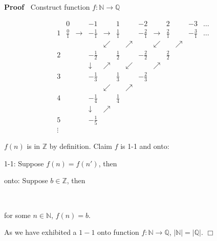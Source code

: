 \documentclass{article}
\newenvironment{proof}{\noindent\textbf{Proof\ }}{\hspace*{\fill}$\Box$\medskip}
\begin{document}
\begin{proof}
  Construct function $f : \mathbb{N} \rightarrow \mathbb{Q}$
  
  
  \[ \begin{array}{lllllllllllll}
       & 0 &  & - 1 &  & 1 &  & - 2 &  & 2 &  & - 3 & \ldots\\
       1 & \frac{0}{1} & \rightarrow & - \frac{1}{1} & \rightarrow &
       \frac{1}{1} &  & - \frac{2}{1} & \rightarrow & \frac{2}{1} &  & -
       \frac{3}{1} & \ldots\\
       &  &  &  & \swarrow &  & \nearrow &  & \swarrow &  & \nearrow &  & \\
       2 &  &  & - \frac{1}{2} &  & \frac{1}{2} &  & - \frac{2}{2} &  &
       \frac{2}{2} &  &  & \\
       &  &  & \downarrow & \nearrow &  & \swarrow &  & \nearrow &  &  &  &
       \\
       3 &  &  & - \frac{1}{3} &  & \frac{1}{3} &  & - \frac{2}{3} &  &  &  & 
       & \\
       &  &  &  & \swarrow &  & \nearrow &  &  &  &  &  & \\
       4 &  &  & - \frac{1}{4} &  & \frac{1}{4} &  &  &  &  &  &  & \\
       &  &  & \downarrow & \nearrow &  &  &  &  &  &  &  & \\
       5 &  &  & - \frac{1}{5} &  &  &  &  &  &  &  &  & \\
       \vdots &  &  &  &  &  &  &  &  &  &  &  & 
     \end{array} \]
  
  
  $f (n)$ is in $\mathbb{Z}$ by definition. Claim $f$ is 1-1 and onto:
  
  1-1: Suppose $f (n) = f (n')$, then
  
  
  
  onto: Suppose $b \in \mathbb{Z}$, then
  
  \
  
  for some $n \in \mathbb{N}$, $f (n) = b$.
  
  As we have exhibited a $1 - 1$ onto function $f : \mathbb{N} \rightarrow
  \mathbb{Q}$, $| \mathbb{N} | = | \mathbb{Q} |$.
\end{proof}
\end{document}
